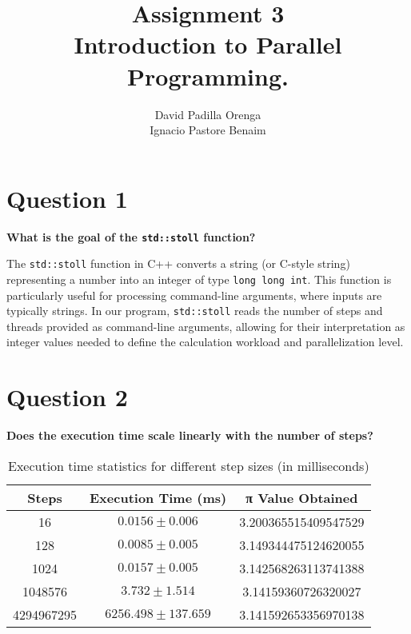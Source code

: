 \documentclass{article}
\title{Assignment 3 \\ \small Introduction to Parallel Programming.}
\author{David Padilla Orenga\\ Ignacio Pastore Benaim}
\date{}  %
\begin{document}
\maketitle

\section*{Question 1}
\textbf{What is the goal of the \texttt{std::stoll} function?}

The \texttt{std::stoll} function in C++ converts a string (or C-style string) representing a number into an integer of type \texttt{long long int}. This function is particularly useful for processing command-line arguments, where inputs are typically strings. In our program, \texttt{std::stoll} reads the number of steps and threads provided as command-line arguments, allowing for their interpretation as integer values needed to define the calculation workload and parallelization level.

\section*{Question 2}

\textbf{Does the execution time scale linearly with the number of steps?}


\begin{table}[h!]
\centering
\begin{tabular}{|c|c|c|}
\hline
\textbf{Steps} & \textbf{Execution Time (ms)} & \textbf{π Value Obtained} \\
\hline
16 &        \(0.0156 \pm  0.006\) & 3.200365515409547529 \\
128 &       \(0.0085 \pm 0.005\)  & 3.149344475124620055 \\
1024 &      \(0.0157 \pm 0.005\)  & 3.142568263113741388 \\
1048576 &   \(3.732 \pm 1.514\)   & 3.14159360726320027 \\
4294967295 &\( 6256.498 \pm 137.659\)  & 3.141592653356970138 \\
\hline
\end{tabular}
\caption{Execution time statistics for different step sizes (in milliseconds)}
\label{table:execution_times_ms}
\end{table}
\end{document}
